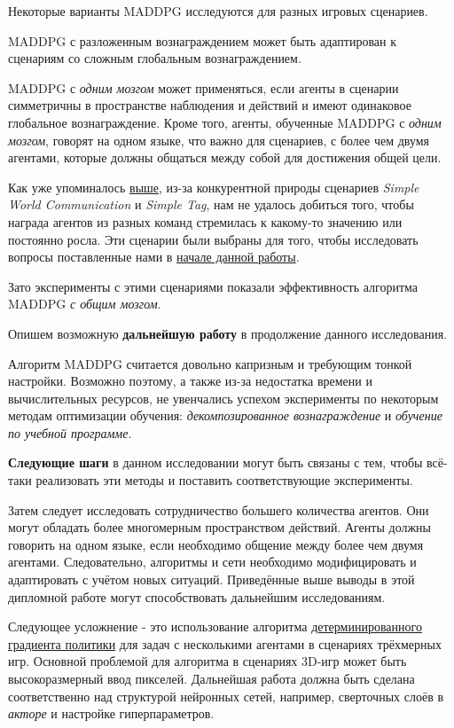 Некоторые варианты MADDPG исследуются для разных игровых сценариев.

MADDPG с разложенным вознаграждением может быть адаптирован к сценариям со сложным глобальным вознаграждением.

MADDPG с \textit{одним мозгом} может применяться, если агенты в сценарии симметричны в пространстве наблюдения и действий и имеют одинаковое глобальное вознаграждение. Кроме того, агенты, обученные MADDPG с \textit{одним мозгом}, говорят на одном языке, что важно для сценариев, с более чем двумя агентами, которые должны общаться между собой для достижения общей цели.

Как уже упоминалось \hyperref[exp-results-svc]{выше}, из-за конкурентной природы сценариев \textit{Simple World Communication} и \textit{Simple Tag}, нам не удалось добиться того, чтобы награда агентов из разных команд стремилась к какому-то значению или постоянно росла. Эти сценарии были выбраны для того, чтобы исследовать вопросы поставленные нами в \hyperref[intro-questions]{начале данной работы}.

Зато эксперименты с этими сценариями показали эффективность алгоритма MADDPG \textit{с общим мозгом}.

Опишем возможную \textbf{дальнейшую работу} в продолжение данного исследования.

Алгоритм MADDPG считается довольно капризным и требующим тонкой настройки. Возможно поэтому, а также из-за недостатка времени и вычислительных ресурсов, не увенчались успехом эксперименты по некоторым методам оптимизации обучения: \textit{декомпозированное вознаграждение} и \textit{обучение по учебной программе}.

\textbf{Следующие шаги} в данном исследовании могут быть связаны с тем, чтобы всё-таки реализовать эти методы и поставить соответствующие эксперименты.

Затем следует исследовать сотрудничество большего количества агентов. Они могут обладать более многомерным пространством действий. Агенты должны говорить на одном языке, если необходимо общение между более чем двумя агентами. Следовательно, алгоритмы и сети необходимо модифицировать и адаптировать с учётом новых ситуаций. Приведённые выше выводы в этой дипломной работе могут способствовать дальнейшим исследованиям.

Следующее усложнение - это использование алгоритма \hyperref[acr:dpg]{детерминированного градиента политики} для задач с несколькими агентами в сценариях трёхмерных игр. Основной проблемой для алгоритма в сценариях 3D-игр может быть высокоразмерный ввод пикселей. Дальнейшая работа должна быть сделана соответственно над структурой нейронных сетей, например, сверточных слоёв в \textit{акторе} и настройке гиперпараметров.

